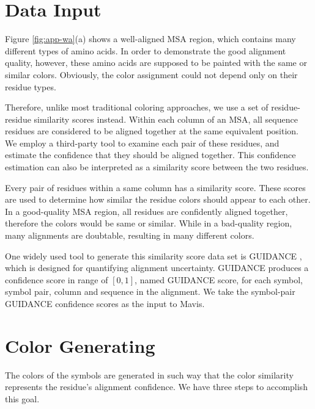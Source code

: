 \section{Data Input}

Figure \ref{fig:app-wa}(a) shows a well-aligned MSA region, which contains many different types of amino acids. In order to demonstrate the good alignment quality, however, these amino acids are supposed to be painted with the same or similar colors. Obviously, the color assignment could not depend only on their residue types.

Therefore, unlike most traditional coloring approaches, we use a set of residue-residue similarity scores instead. Within each column of an MSA, all sequence residues are considered to be aligned together at the same equivalent position. We employ a third-party tool to examine each pair of these residues, and estimate the confidence that they should be aligned together. This confidence estimation can also be interpreted as a similarity score between the two residues.

Every pair of residues within a same column has a similarity score. These scores are used to determine how similar the residue colors should appear to each other. In a good-quality MSA region, all residues are confidently aligned together, therefore the colors would be same or similar. While in a bad-quality region, many alignments are doubtable, resulting in many different colors.

One widely used tool to generate this similarity score data set is GUIDANCE \cite{Penn:2010aa,Penn:2010ab}, which is designed for quantifying alignment uncertainty. GUIDANCE produces a confidence score in range of $[0, 1]$, named GUIDANCE score, for each symbol, symbol pair, column and sequence in the alignment. We take the symbol-pair GUIDANCE confidence scores as the input to Mavis.

\section{Color Generating}

The colors of the symbols are generated in such way that the color similarity represents the residue's alignment confidence. We have three steps to accomplish this goal.


